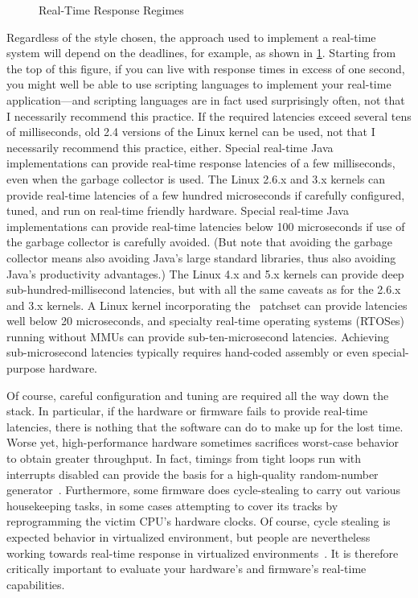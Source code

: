 \begin{figure}
\centering
{}
\caption{Real-Time Response Regimes}
\label{fig:advsync:Real-Time Response Regimes}
\end{figure}

Regardless of the style chosen, the approach used to implement a real-time
system will depend on the deadlines, for example, as shown in
\cref{fig:advsync:Real-Time Response Regimes}.
Starting from the top of this figure, if you can live with response times in
excess of one second, you might well be able to use scripting languages
to implement your real-time application---and scripting languages are
in fact used surprisingly often, not that I necessarily recommend this
practice.
If the required latencies exceed several tens of milliseconds,
old 2.4 versions of the Linux kernel can be used, not that I necessarily
recommend this practice, either.
Special real-time Java implementations can provide real-time response
latencies of a few milliseconds, even when the garbage collector is
used.
The Linux 2.6.x and 3.x kernels can provide real-time latencies of
a few hundred microseconds if carefully configured, tuned, and run
on real-time friendly hardware.
Special real-time Java implementations can provide real-time latencies
below 100 microseconds if use of the garbage collector is carefully avoided.
(But note that avoiding the garbage collector means also avoiding
Java's large standard libraries, thus also avoiding Java's productivity
advantages.)
The Linux 4.x and 5.x kernels can provide deep sub-hundred-millisecond
latencies, but with all the same caveats as for the 2.6.x and 3.x kernels.
A Linux kernel incorporating the \rt\ patchset can provide latencies
well below 20 microseconds, and specialty real-time operating systems (RTOSes)
running without MMUs can provide sub-ten-microsecond
latencies.
Achieving sub-microsecond latencies typically requires hand-coded assembly
or even special-purpose hardware.

Of course, careful configuration and tuning are required all the way down
the stack.
In particular, if the hardware or firmware fails to provide real-time
latencies, there is nothing that the software can do to make up for the
lost time.
Worse yet, high-performance hardware sometimes sacrifices worst-case behavior
to obtain greater throughput.
In fact, timings from tight loops run with interrupts disabled can
provide the basis for a high-quality random-number
generator~\cite{PeterOkech2009InherentRandomness}.
Furthermore, some firmware does cycle-stealing to carry out various
housekeeping tasks, in some cases attempting to cover its tracks by
reprogramming the victim CPU's hardware clocks.
Of course, cycle stealing is expected behavior in virtualized
environment, but people are nevertheless working towards real-time
response in virtualized
environments~\cite{ThomasGleixner2012KVMrealtime,JanKiszka2014virtRT}.
It is therefore critically important to evaluate your hardware's and
firmware's real-time capabilities.

